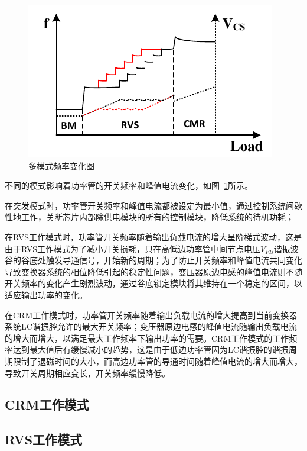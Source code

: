 \begin{figure}[htbp] 
    \centering
    \includegraphics[width=0.8\linewidth]{figures/模式切换2.pdf}
    \caption{多模式频率变化图}
    \label{fig:模式切换2}
\end{figure}

不同的模式影响着功率管的开关频率和峰值电流变化，如图~\ref{fig:模式切换2}所示。

在突发模式时，功率管开关频率和峰值电流都被设定为最小值，通过控制系统间歇性地工作，关断芯片内部除供电模块的所有的控制模块，降低系统的待机功耗；

在RVS工作模式时，功率管开关频率随着输出负载电流的增大呈阶梯式波动，这是由于RVS工作模式为了减小开关损耗，只在高低边功率管中间节点电压$V_{FB}$谐振波谷的谷底处触发导通信号，开始新的周期；为了防止开关频率和峰值电流共同变化导致变换器系统的相位降低引起的稳定性问题，变压器原边电感的峰值电流则不随开关频率的变化产生剧烈波动，通过谷底锁定模块将其维持在一个稳定的区间，以适应输出功率的变化。

在CRM工作模式时，功率管开关频率随着输出负载电流的增大提高到当前变换器系统LC谐振腔允许的最大开关频率；变压器原边电感的峰值电流随输出负载电流的增大而增大，以满足最大工作频率下输出功率的需要。CRM工作模式的工作频率达到最大值后有缓慢减小的趋势，这是由于低边功率管因为LC谐振腔的谐振周期限制了退磁时间的大小，而高边功率管的导通时间随着峰值电流的增大而增大，导致开关周期相应变长，开关频率缓慢降低。

\subsection{CRM工作模式}

\subsection{RVS工作模式}

